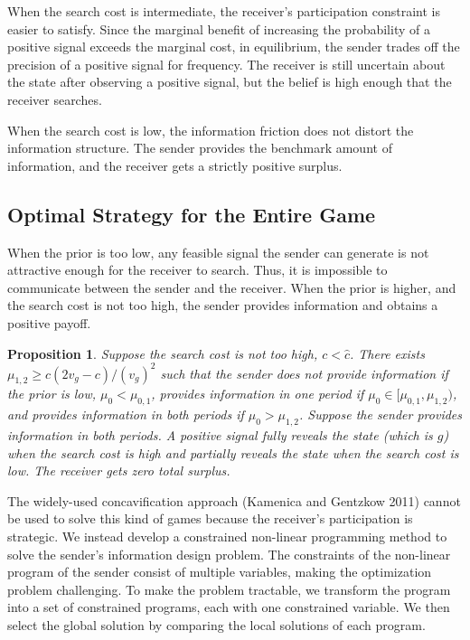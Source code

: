 \documentclass[11pt]{extarticle}
\newtheorem{proposition}{Proposition}
\begin{document}
When the search cost is intermediate, the receiver's participation constraint is easier to satisfy. Since the marginal benefit of increasing the probability of a positive signal exceeds the marginal cost, in equilibrium, the sender trades off the precision of a positive signal for frequency. The receiver is still uncertain about the state after observing a positive signal, but the belief is high enough that the receiver searches. 

When the search cost is low, the information friction does not distort the information structure. The sender provides the benchmark amount of information, and the receiver gets a strictly positive surplus.

\subsection{Optimal Strategy for the Entire Game}
When the prior is too low, any feasible signal the sender can generate is not attractive enough for the receiver to search. Thus, it is impossible to communicate between the sender and the receiver. When the prior is higher, and the search cost is not too high, the sender provides information and obtains a positive payoff.

\begin{proposition}\label{strategy2p_smooth}
	Suppose the search cost is not too high, $c < \widehat{c}$. There exists $\mu_{1,2} \geq c(2v_g-c)/(v_g)^2$ such that the sender does not provide information if the prior is low, $\mu_0 < \mu_{0,1}$, provides information in one period if $\mu_0 \in [\mu_{0,1},\mu_{1,2})$, and provides information in both periods if $\mu_0 > \mu_{1,2}$. Suppose the sender provides information in both periods. A positive signal fully reveals the state (which is $g$) when the search cost is high and partially reveals the state when the search cost is low. The receiver gets zero total surplus.
\end{proposition}

The widely-used concavification approach (Kamenica and Gentzkow 2011) cannot be used to solve this kind of games because the receiver's participation is strategic. We instead develop a constrained non-linear programming method to solve the sender's information design problem. The constraints of the non-linear program of the sender consist of multiple variables, making the optimization problem challenging. To make the problem tractable, we transform the program into a set of constrained programs, each with one constrained variable. We then select the global solution by comparing the local solutions of each program. 
\end{document}
